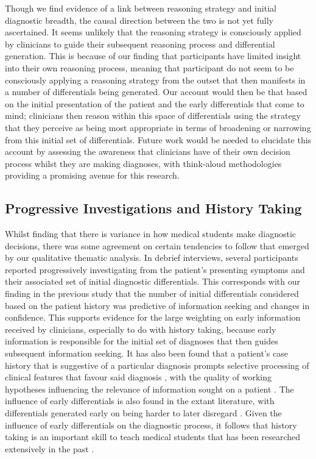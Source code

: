\documentclass[a4paper, nobind]{templates/ociamthesis}
\begin{document}
Though we find evidence of a link between reasoning strategy and initial diagnostic breadth, the causal direction between the two is not yet fully ascertained. It seems unlikely that the reasoning strategy is consciously applied by clinicians to guide their subsequent reasoning process and differential generation. This is because of our finding that participants have limited insight into their own reasoning process, meaning that participant do not seem to be consciously applying a reasoning strategy from the outset that then manifests in a number of differentials being generated. Our account would then be that based on the initial presentation of the patient and the early differentials that come to mind; clinicians then reason within this space of differentials using the strategy that they perceive as being most appropriate in terms of broadening or narrowing from this initial set of differentials. Future work would be needed to elucidate this account by assessing the awareness that clinicians have of their own decision process whilst they are making diagnoses, with think-aloud methodologies providing a promising avenue for this research.

\subsection{Progressive Investigations and History Taking}\label{progressive-investigations-and-history-taking}

Whilst finding that there is variance in how medical students make diagnostic decisions, there was some agreement on certain tendencies to follow that emerged by our qualitative thematic analysis. In debrief interviews, several participants reported progressively investigating from the patient's presenting symptoms and their associated set of initial diagnostic differentials. This corresponds with our finding in the previous study that the number of initial differentials considered based on the patient history was predictive of information seeking and changes in confidence. This supports evidence for the large weighting on early information received by clinicians, especially to do with history taking, because early information is responsible for the initial set of diagnoses that then guides subsequent information seeking. It has also been found that a patient's case history that is suggestive of a particular diagnosis prompts selective processing of clinical features that favour said diagnosis \autocite{leblanc_believing_2002}, with the quality of working hypotheses influencing the relevance of information sought on a patient \autocite{brooks_difficulty_2000}. The influence of early differentials is also found in the extant literature, with differentials generated early on being harder to later disregard \autocite{kourtidis_influences_2022,redelmeier_fallacy_2023}. Given the influence of early differentials on the diagnostic process, it follows that history taking is an important skill to teach medical students that has been researched extensively in the past \autocite{keifenheim_teaching_2015}.\\
\end{document}

